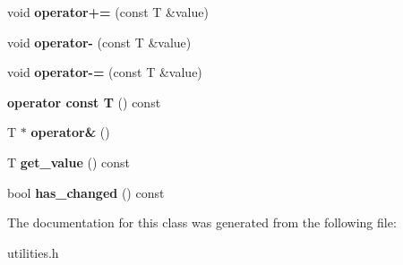 \begin{DoxyCompactItemize}
\item 
\hypertarget{classbackup__variable_a4b5753702dbfdaf23f9eb8b210ed80a2}{void {\bfseries operator+=} (const T \&value)}\label{classbackup__variable_a4b5753702dbfdaf23f9eb8b210ed80a2}

\item 
\hypertarget{classbackup__variable_abc321dce84d827d20d69b96653049739}{void {\bfseries operator-\/} (const T \&value)}\label{classbackup__variable_abc321dce84d827d20d69b96653049739}

\item 
\hypertarget{classbackup__variable_adc890d1d8539089e654280bf18e76034}{void {\bfseries operator-\/=} (const T \&value)}\label{classbackup__variable_adc890d1d8539089e654280bf18e76034}

\item 
\hypertarget{classbackup__variable_acba460a7693d0db536d7f9768ab6cf67}{{\bfseries operator const T} () const }\label{classbackup__variable_acba460a7693d0db536d7f9768ab6cf67}

\item 
\hypertarget{classbackup__variable_a61a6e2eee207d52e8f80f23595615627}{T $\ast$ {\bfseries operator\&} ()}\label{classbackup__variable_a61a6e2eee207d52e8f80f23595615627}

\item 
\hypertarget{classbackup__variable_a1239b41350b1570e28479647525f9846}{T {\bfseries get\+\_\+value} () const }\label{classbackup__variable_a1239b41350b1570e28479647525f9846}

\item 
\hypertarget{classbackup__variable_a4d062c1afac850f6e965ccf6ebdca951}{bool {\bfseries has\+\_\+changed} () const }\label{classbackup__variable_a4d062c1afac850f6e965ccf6ebdca951}

\end{DoxyCompactItemize}


The documentation for this class was generated from the following file\+:\begin{DoxyCompactItemize}
\item 
utilities.\+h\end{DoxyCompactItemize}
